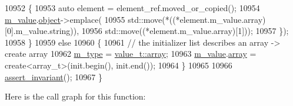 \begin{DoxyCode}
10952             \{
10953                 \textcolor{keyword}{auto} element = element\_ref.moved\_or\_copied();
10954                 \hyperlink{classnlohmann_1_1basic__json_aeb0814f76966f99290cb29e127c90a77}{m\_value}.\hyperlink{unionnlohmann_1_1basic__json_1_1json__value_a4a2209bb26e7088cd36bf24824ab5521}{object}->emplace(
10955                     std::move(*((*element.m\_value.array)[0].m\_value.string)),
10956                     std::move((*element.m\_value.array)[1]));
10957             \});
10958         \}
10959         \textcolor{keywordflow}{else}
10960         \{
10961             \textcolor{comment}{// the initializer list describes an array -> create array}
10962             \hyperlink{classnlohmann_1_1basic__json_a91990b60d7d4d67968a2c1db677536e7}{m\_type} = \hyperlink{namespacenlohmann_1_1detail_a1ed8fc6239da25abcaf681d30ace4985af1f713c9e000f5d3f280adbd124df4f5}{value\_t::array};
10963             \hyperlink{classnlohmann_1_1basic__json_aeb0814f76966f99290cb29e127c90a77}{m\_value}.\hyperlink{unionnlohmann_1_1basic__json_1_1json__value_a7947687f3ae1911d6e9847e2b3226157}{array} = create<array\_t>(init.begin(), init.end());
10964         \}
10965 
10966         \hyperlink{classnlohmann_1_1basic__json_a4a82d3fb7a111641decf35c2fb707c7f}{assert\_invariant}();
10967     \}
\end{DoxyCode}
Here is the call graph for this function\+:
\mbox{\label{classnlohmann_1_1basic__json_ab6816ae5100409254ed0a8bc21c387bb}} 
